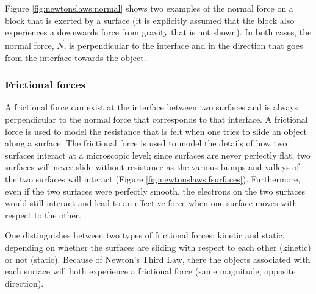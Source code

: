 Figure \ref{fig:newtonslaws:normal} shows two examples of the normal force on a block that is exerted by a surface (it is explicitly assumed that the block also experiences a downwards force from gravity that is not shown). In both cases, the normal force, $\vec N$, is perpendicular to the interface and in the direction that goes from the interface towards the object.



\subsubsection{Frictional forces}
A frictional force can exist at the interface between two surfaces and is always perpendicular to the normal force that corresponds to that interface. A frictional force is used to model the resistance that is felt when one tries to slide an object along a surface. The frictional force is used to model the details of how two surfaces interact at a microscopic level; since surfaces are never perfectly flat, two surfaces will never slide without resistance as the various bumps and valleys of the two surfaces will interact (Figure \ref{fig:newtonslaws:fsurfaces}). Furthermore, even if the two surfaces were perfectly smooth, the electrons on the two surfaces would still interact and lead to an effective force when one surface moves with respect to the other. 


One distinguishes between two types of frictional forces: kinetic and static, depending on whether the surfaces are sliding with respect to each other (kinetic) or not (static). Because of Newton's Third Law, there the objects associated with each surface will both experience a frictional force (same magnitude, opposite direction).

